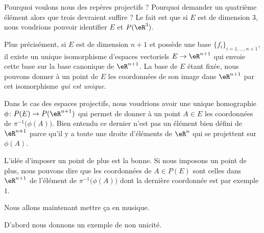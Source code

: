 \begin{normaltext}
Pourquoi voulons nous des repères projectifs ? Pourquoi demander un quatrième élément alors que trois devraient suffire ? Le fait est que si \( E\) est de dimension \( 3\), nous voudrions pouvoir identifier \( E\) et \( P(\eR^3)\).

Plus précisément, si \( E\) est de dimension \( n+1\) et possède une base \( \{ f_i \}_{i=1,\ldots, n+1}\), il existe un unique isomorphisme d'espaces vectoriels \( E\to \eR^{n+1}\) qui envoie cette base sur la base canonique de \( \eR^{n+1}\). La base de \( E\) étant fixée, nous pouvons donner à un point de \( E\) les coordonnées de son image dans \( \eR^{n+1}\) par cet isomorphisme \emph{qui est unique}.

Dans le cas des espaces projectifs, nous voudrions avoir une unique homographie \( \phi\colon P(E)\to P(\eR^{n+1})\) qui permet de donner à un point \( A\in E\) les coordonnées de \( \pi^{-1}\big( \phi(A) \big)\). Bien entendu ce dernier n'est pas un élément bien défini de \( \eR^{n+1}\) parce qu'il y a toute une droite d'éléments de \( \eR^n\) qui se projettent sur \( \phi(A)\).

L'idée d'imposer un point de plus est la bonne. Si nous imposons un point de plus, nous pouvons dire que les coordonnées de \( A\in P(E)\) sont celles dans \( \eR^{n+1}\) de l'élément de \( \pi^{-1}\big( \phi(A) \big)\) dont la dernière coordonnée est par exemple \( 1\).

Nous allons maintenant mettre ça en musique.
\end{normaltext}

D'abord nous donnons un exemple de non unicité.

